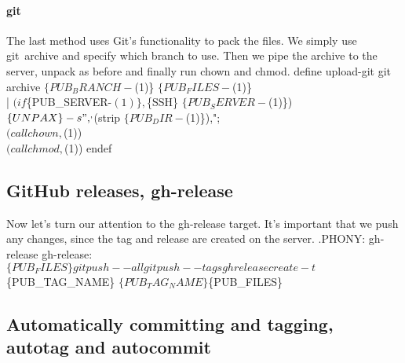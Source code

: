 \paragraph{git}

The last method uses Git's functionality to pack the files.
We simply use {\Tt{}git\ archive\nwendquote} and specify which branch to use.
Then we pipe the archive to the server, unpack as before and finally run 
{\Tt{}chown\nwendquote} and {\Tt{}chmod\nwendquote}.
\nwenddocs{}\endmoddef\nwstartdeflinemarkup{}\nwenddeflinemarkup
define upload-git
git archive $\{PUB_BRANCH-$(1)\} $\{PUB_FILES-$(1)\} \\
  | $(if $\{PUB_SERVER-$(1)\},$\{SSH\} $\{PUB_SERVER-$(1)\}) \\
    $\{UNPAX\} -s ",^,$(strip $\{PUB_DIR-$(1)\}),"; \\
$(call chown,$(1)) \\
$(call chmod,$(1))
endef
\nwendcode{}\nwdocspar


\subsection{GitHub releases, {\Tt{}gh-release\nwendquote}}

Now let's turn our attention to the {\Tt{}gh-release\nwendquote} target.
It's important that we push any changes, since the tag and release are created 
on the server.
\nwenddocs{}\endmoddef\nwstartdeflinemarkup{}\nwenddeflinemarkup
.PHONY: gh-release
gh-release: $\{PUB_FILES\}
  git push --all
  git push --tags
  gh release create -t $\{PUB_TAG_NAME\} $\{PUB_TAG_NAME\} $\{PUB_FILES\}
\nwendcode{}\nwdocspar


\subsection{Automatically committing and tagging,
  {\Tt{}autotag\nwendquote} and {\Tt{}autocommit\nwendquote}}

